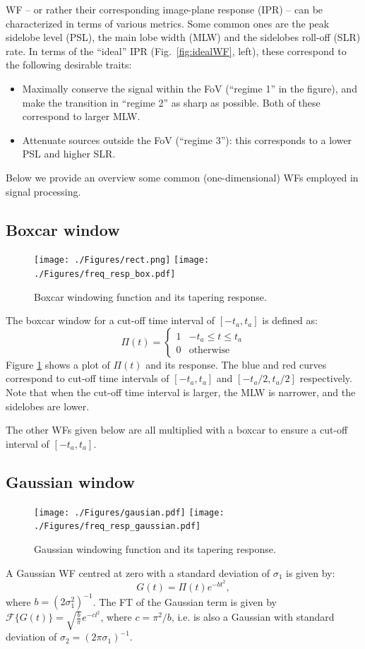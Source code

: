\documentclass[useAMS,usenatbib]{mn2e}
\begin{document}
WF -- or rather their corresponding image-plane response (IPR) -- can be characterized in terms of various metrics. Some common 
ones are the peak sidelobe level (PSL), the main lobe width (MLW) and the sidelobes roll-off (SLR) rate. In terms of the ``ideal'' 
IPR (Fig.~\ref{fig:idealWF}, left), these correspond to the following desirable traits:

\begin{itemize}
\item Maximally conserve the signal within the FoV (``regime 1'' in the figure), and make the transition in ``regime 2'' as sharp as possible. Both of these correspond to larger MLW.
\item Attenuate sources outside the FoV (``regime 3''): this corresponds to a lower PSL and higher SLR.
\end{itemize}

Below we provide an overview some common (one-dimensional) WFs employed in signal processing.

\subsection{Boxcar window}
\begin{figure}
\texttt{[image: ./Figures/rect.png]}%
\texttt{[image: ./Figures/freq\_resp\_box.pdf]}
\caption{Boxcar windowing function and its tapering response.}\label{fig:wf:box}
\end{figure}
The boxcar window for a cut-off time interval of $[-t_a,t_a]$ is defined as:
\begin{equation}
\Pi(t)=\left\{
\begin{array}{rl}
1 & \mbox{$-t_a \leq t \leq t_a$} \\
0 & \mbox{otherwise}
\end{array}\right.
\end{equation}
Figure \ref{fig:wf:box} shows a plot of $\Pi(t)$ and its response. The blue and red curves 
correspond to cut-off time intervals of $[-t_a, t_a]$ and 
$[-t_a/2,t_a/2]$ respectively. Note that when the cut-off time interval is larger, the MLW is 
narrower, and the sidelobes are lower.

The other WFs given below are all multiplied with a boxcar to ensure a cut-off interval of $[-t_a,t_a]$.

\subsection{Gaussian window}
\begin{figure}
\texttt{[image: ./Figures/gausian.pdf]}%
\texttt{[image: ./Figures/freq\_resp\_gaussian.pdf]}
\caption{Gaussian windowing function and its tapering response.}\label{fig:wf:gauss}
\end{figure}
A Gaussian WF centred at zero with a standard deviation of $\sigma_1$ is given by: 
\begin{equation}
  G(t)= \Pi(t) e^{-bt^{2}}, \label{eq:gauss}
\end{equation}
where $b=(2\sigma_1^2)^{-1}$. The FT of the Gaussian term is given by 
$\mathcal{F}\big\{G(t)\big\}=\sqrt{\frac{b}{\pi}}e^{-cl^2}$, where $c=\pi^2/b$, i.e.
is also a Gaussian with standard deviation of $\sigma_2= (2\pi\sigma_1)^{-1}$.
\end{document}
